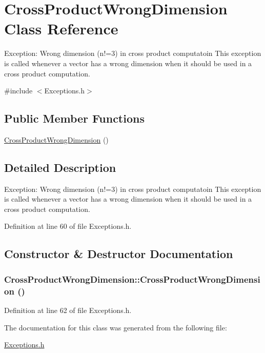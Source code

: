 \section{CrossProductWrongDimension Class Reference}
\label{classCrossProductWrongDimension}


Exception: Wrong dimension (n!=3) in cross product computatoin This exception is called whenever a vector has a wrong dimension when it should be used in a cross product computation.  




{\ttfamily \#include $<$Exceptions.h$>$}

\subsection*{Public Member Functions}
\begin{DoxyCompactItemize}
\item 
\hyperlink{classCrossProductWrongDimension_a74e19b03d84ba6d7f0c46e759986813a}{CrossProductWrongDimension} ()
\end{DoxyCompactItemize}


\subsection{Detailed Description}
Exception: Wrong dimension (n!=3) in cross product computatoin This exception is called whenever a vector has a wrong dimension when it should be used in a cross product computation. 

Definition at line 60 of file Exceptions.h.



\subsection{Constructor \& Destructor Documentation}
\subsubsection[{CrossProductWrongDimension}]{\setlength{\rightskip}{0pt plus 5cm}CrossProductWrongDimension::CrossProductWrongDimension ()}\label{classCrossProductWrongDimension_a74e19b03d84ba6d7f0c46e759986813a}


Definition at line 62 of file Exceptions.h.



The documentation for this class was generated from the following file:\begin{DoxyCompactItemize}
\item 
\hyperlink{Exceptions_8h}{Exceptions.h}\end{DoxyCompactItemize}
